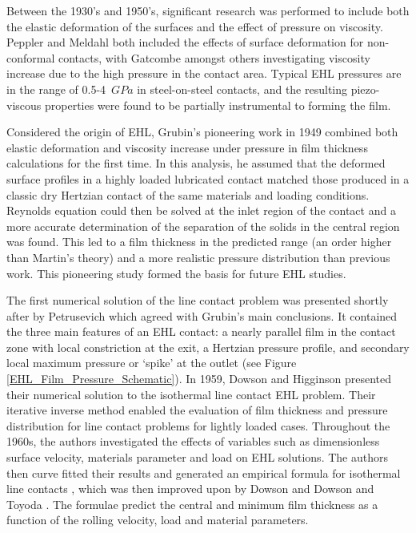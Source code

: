 Between the 1930’s and 1950’s, significant research was performed to include both the elastic deformation of the surfaces and the effect of pressure on viscosity. Peppler \cite{Peppler1936} and Meldahl \cite{Meldahl1941} both included the effects of surface deformation for non-conformal contacts, with Gatcombe \cite{Gatcombe1945} amongst others investigating viscosity increase due to the high pressure in the contact area. Typical EHL pressures are in the range of 0.5-4~$GPa$ in steel-on-steel contacts, and the resulting piezo-viscous properties were found to be partially instrumental to forming the film.

Considered the origin of EHL, Grubin’s pioneering work in 1949 \cite{Grubin1949} combined both elastic deformation and viscosity increase under pressure in film thickness calculations for the first time. In this analysis, he assumed that the deformed surface profiles in a highly loaded lubricated contact matched those produced in a classic dry Hertzian contact of the same materials and loading conditions. Reynolds equation could then be solved at the inlet region of the contact and a more accurate determination of the separation of the solids in the central region was found. This led to a film thickness in the predicted range (an order higher than Martin’s theory) and a more realistic pressure distribution than previous work. This pioneering study formed the basis for future EHL studies.

The first numerical solution of the line contact problem was presented shortly after by Petrusevich \cite{Petrusovich1951} which agreed with Grubin’s main conclusions. It contained the three main features of an EHL contact: a nearly parallel film in the contact zone with local constriction at the exit, a Hertzian pressure profile, and secondary local maximum pressure or ‘spike’ at the outlet (see Figure \ref{EHL_Film_Pressure_Schematic}). In 1959, Dowson and Higginson \cite{Dowson1959} presented their numerical solution to the isothermal line contact EHL problem. Their iterative inverse method enabled the evaluation of film thickness and pressure distribution for line contact problems for lightly loaded cases. Throughout the 1960s, the authors investigated the effects of variables such as dimensionless surface velocity, materials parameter and load on EHL solutions. The authors then curve fitted their results and generated an empirical formula for isothermal line contacts \cite{Dowson1961}, which was then improved upon by Dowson \cite{Dowson1966} and Dowson and Toyoda \cite{Dowson1979}. The formulae predict the central and minimum film thickness as a function of the rolling velocity, load and material parameters.

